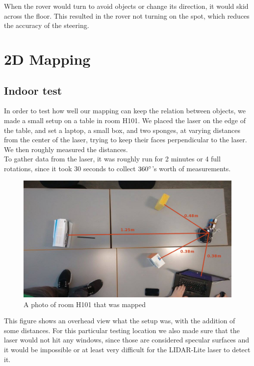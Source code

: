 When the rover would turn to avoid objects or change its direction, it would skid across the floor. This resulted in the rover not turning on the spot, which reduces the accuracy of the steering.

\clearpage
\section{2D Mapping}

\subsection{Indoor test}
In order to test how well our mapping can keep the relation between objects, we made a small setup on a table in room H101. We placed the laser on the edge of the table, and set a laptop, a small box, and two sponges, at varying distances from the center of the laser, trying to keep their faces perpendicular to the laser. We then roughly measured the distances.\\
To gather data from the laser, it was roughly run for 2 minutes or 4 full rotations,  since it took 30 seconds to collect $360\degree$'s worth of measurements.

\begin{figure}[H]
	\centering
	\includegraphics[scale=.4]{images/h101-photo.jpg}
	\caption{A photo of room H101 that was mapped}
	\label{laser-test}
\end{figure}
	
This figure shows an overhead view what the setup was, with the addition of some distances. For this particular testing location we also made sure that the laser would not hit any windows, since those are considered specular surfaces and it would be impossible or at least very difficult for the LIDAR-Lite laser to detect it.

